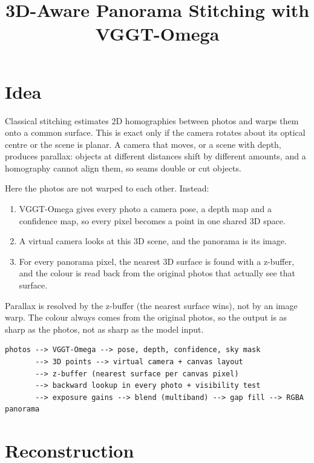 \documentclass[11pt, a4paper]{article}
\title{3D-Aware Panorama Stitching with VGGT-Omega}
\author{}
\date{}
\begin{document}
\maketitle

\section{Idea}

Classical stitching estimates 2D homographies between photos and warps them onto a common surface.
This is exact only if the camera rotates about its optical centre or the scene is planar. A camera that
moves, or a scene with depth, produces parallax: objects at different distances shift by different
amounts, and a homography cannot align them, so seams double or cut objects.

Here the photos are not warped to each other. Instead:
\begin{enumerate}
  \item VGGT-Omega gives every photo a camera pose, a depth map and a confidence map, so every
        pixel becomes a point in one shared 3D space.
  \item A virtual camera looks at this 3D scene, and the panorama is its image.
  \item For every panorama pixel, the nearest 3D surface is found with a z-buffer, and the colour is
        read back from the original photos that actually see that surface.
\end{enumerate}
Parallax is resolved by the z-buffer (the nearest surface wins), not by an image warp. The colour always
comes from the original photos, so the output is as sharp as the photos, not as sharp as the model input.

\begin{verbatim}
photos --> VGGT-Omega --> pose, depth, confidence, sky mask
       --> 3D points --> virtual camera + canvas layout
       --> z-buffer (nearest surface per canvas pixel)
       --> backward lookup in every photo + visibility test
       --> exposure gains --> blend (multiband) --> gap fill --> RGBA panorama
\end{verbatim}

\section{Reconstruction}
\end{document}
